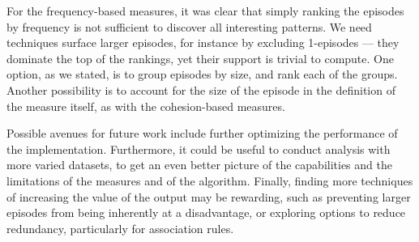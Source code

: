 For the frequency-based measures, it was clear that simply ranking the episodes by frequency is not sufficient to discover all interesting patterns. We need techniques surface larger episodes, for instance by excluding 1-episodes --- they dominate the top of the rankings, yet their support is trivial to compute. One option, as we stated, is to group episodes by size, and rank each of the groups. Another possibility is to account for the size of the episode in the definition of the measure itself, as with the cohesion-based measures.

Possible avenues for future work include further optimizing the performance of the implementation. Furthermore, it could be useful to conduct analysis with more varied datasets, to get an even better picture of the capabilities and the limitations of the measures and of the algorithm. Finally, finding more techniques of increasing the value of the output may be rewarding, such as preventing larger episodes from being inherently at a disadvantage, or exploring options to reduce redundancy, particularly for association rules.
